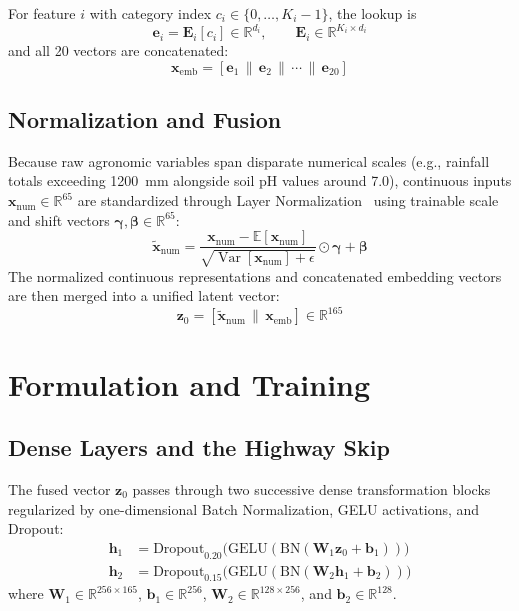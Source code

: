 \documentclass[conference,10pt,letterpaper]{IEEEtran}
\begin{document}
For feature $i$ with category index $c_i \in \{0, \dots, K_i - 1\}$, the lookup is
\begin{equation}
\mathbf{e}_i = \mathbf{E}_i[c_i] \in \mathbb{R}^{d_i}, \qquad \mathbf{E}_i \in \mathbb{R}^{K_i \times d_i}
\end{equation}
and all 20 vectors are concatenated:
\begin{equation}
\mathbf{x}_{\text{emb}} = \left[\mathbf{e}_1 \,\|\, \mathbf{e}_2 \,\|\, \cdots \,\|\, \mathbf{e}_{20}\right]
\end{equation}

\subsection{Normalization and Fusion}
Because raw agronomic variables span disparate numerical scales (e.g., rainfall totals exceeding 1200~mm alongside soil pH values around 7.0), continuous inputs $\mathbf{x}_{\text{num}} \in \mathbb{R}^{65}$ are standardized through Layer Normalization~\cite{ba2016layer} using trainable scale and shift vectors $\boldsymbol{\gamma}, \boldsymbol{\beta} \in \mathbb{R}^{65}$:
\begin{equation}
\tilde{\mathbf{x}}_{\text{num}} = \frac{\mathbf{x}_{\text{num}} - \mathbb{E}[\mathbf{x}_{\text{num}}]}{\sqrt{\operatorname{Var}[\mathbf{x}_{\text{num}}] + \epsilon}} \odot \boldsymbol{\gamma} + \boldsymbol{\beta}
\end{equation}
The normalized continuous representations and concatenated embedding vectors are then merged into a unified latent vector:
\begin{equation}
\mathbf{z}_0 = \left[\tilde{\mathbf{x}}_{\text{num}} \,\|\, \mathbf{x}_{\text{emb}}\right] \in \mathbb{R}^{165}
\end{equation}

\section{Formulation and Training}

\subsection{Dense Layers and the Highway Skip}
The fused vector $\mathbf{z}_0$ passes through two successive dense transformation blocks regularized by one-dimensional Batch Normalization, GELU activations, and Dropout:
\begin{align}
\mathbf{h}_1 &= \text{Dropout}_{0.20}\big(\text{GELU}(\text{BN}(\mathbf{W}_1 \mathbf{z}_0 + \mathbf{b}_1))\big) \\
\mathbf{h}_2 &= \text{Dropout}_{0.15}\big(\text{GELU}(\text{BN}(\mathbf{W}_2 \mathbf{h}_1 + \mathbf{b}_2))\big)
\end{align}
where $\mathbf{W}_1 \in \mathbb{R}^{256 \times 165}$, $\mathbf{b}_1 \in \mathbb{R}^{256}$, $\mathbf{W}_2 \in \mathbb{R}^{128 \times 256}$, and $\mathbf{b}_2 \in \mathbb{R}^{128}$.
\end{document}
